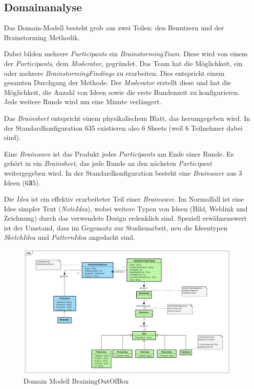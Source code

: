 \subsection{Domainanalyse}
\label{subsec:domain-analyse}

Das Domain-Modell besteht grob aus zwei Teilen: den Benutzern und der Brainstorming Methodik. 

Dabei bilden mehrere \textit{Participants} ein \textit{BrainstormingTeam}. Diese wird von einem der \textit{Participants}, dem \textit{Moderator}, gegründet.  Das Team hat die Möglichkeit, ein oder mehrere \textit{BrainstormingFindings} zu erarbeiten. Dies entspricht einem gesamten Durchgang der Methode. Der \textit{Moderator }erstellt diese und hat die Möglichkeit, die Anzahl von Ideen sowie die erste Rundenzeit zu konfigurieren. Jede weitere Runde wird um eine Minute verlängert.

Das \textit{Brainsheet} entspricht einem physikalischem Blatt, das herumgegeben wird. In der Standardkonfiguration 635 existieren also 6 Sheets (weil 6 Teilnehmer dabei sind).

Eine \textit{Brainwave} ist das Produkt jedes \textit{Participants }am Ende einer Runde. Es gehört in ein \textit{Brainsheet}, das jede Runde an den nächsten \textit{Participant }weitergegeben wird. In der Standardkonfiguration besteht eine \textit{Brainwave }aus 3 Ideen (6\textbf{3}5).

Die \textit{Idea} ist ein effektiv erarbeiteter Teil einer \textit{Brainwave}. Im Normalfall ist eine Idee simpler Text (\textit{NoteIdea}), wobei weitere Typen von Ideen (Bild, Weblink und Zeichnung) durch das verwendete Design erdenklich sind. Speziell erwähnenswert ist der Umstand, dass im Gegensatz zur Studienarbeit, neu die Ideentypen \textit{SketchIdea }und \textit{PatternIdea }angedacht sind.

\begin{figure}[h]
	\centering
	\includegraphics[width=1\linewidth]{img/domain-analyse/DomainModell-Methode635}
	\caption{Domain Modell BrainingOutOfBox}
	\label{fig:domainmodell-methode635}
\end{figure}

